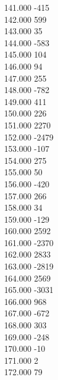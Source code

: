 { 141.000	-415 \\
 142.000	599 \\
 143.000	35 \\
 144.000	-583 \\
 145.000	104 \\
 146.000	94 \\
 147.000	255 \\
 148.000	-782 \\
 149.000	411 \\
 150.000	226 \\
 151.000	2270 \\
 152.000	-2479 \\
 153.000	-107 \\
 154.000	275 \\
 155.000	50 \\
 156.000	-420 \\
 157.000	266 \\
 158.000	34 \\
 159.000	-129 \\
 160.000	2592 \\
 161.000	-2370 \\
 162.000	2833 \\
 163.000	-2819 \\
 164.000	2569 \\
 165.000	-3031 \\
 166.000	968 \\
 167.000	-672 \\
 168.000	303 \\
 169.000	-248 \\
 170.000	-10 \\
 171.000	2 \\
 172.000	79 \\
}
